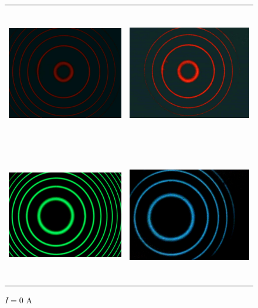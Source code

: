 \documentclass[a4paper,12pt,abstracton]{scrartcl}
\begin{document}
\begin{figure}[H]
    \centering
    \begin{tabular}{c c}
      \includegraphics[height=6cm,keepaspectratio]{images/z0.png} & \includegraphics[height=6cm,keepaspectratio]{images/zl0.png} \\\\
      \includegraphics[width=7.5cm,keepaspectratio]{images/za0.png} & \includegraphics[height=6cm,keepaspectratio]{images/zal0.png} \\
      \end{tabular}
    \caption{$I=0$ A }
    \label{fig:B0}
\end{figure}
\end{document}
